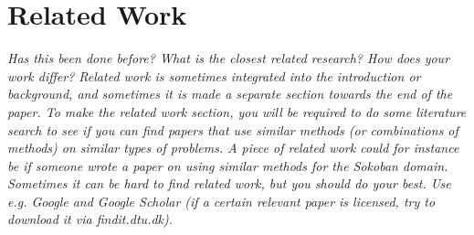 \section{Related Work}
\label{sec:related_work}

\textit{Has this been done before? What is the closest related research? How does your work differ? Related work is sometimes integrated into the introduction or background, and sometimes it is made a separate section towards the end of the paper. To make the related work section, you will be required to do some literature search to see if you can find papers that use similar methods (or combinations of methods) on similar types of problems. A piece of related work could for instance be if someone wrote a paper on using similar methods for the Sokoban domain. Sometimes it can be hard to find related work, but you should do your best. Use e.g. Google and Google Scholar (if a certain relevant paper is licensed, try to download it via findit.dtu.dk).}

